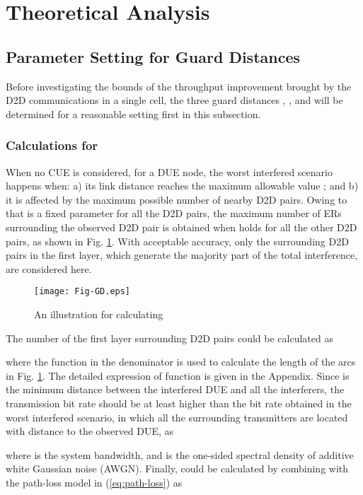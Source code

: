 \documentclass[journal, 10pt]{IEEEtran}
\begin{document}
\section{Theoretical Analysis}\label{sec:ana}

\subsection{Parameter Setting for Guard Distances}
Before investigating the bounds of the throughput improvement brought
by the D2D communications in a single cell, the three guard distances
, , and  will be determined
for a reasonable setting first in this subsection. 

\subsubsection{Calculations for }
When no CUE is considered, for a DUE node, the worst interfered
scenario happens when: a) its link distance reaches the maximum
allowable value ; and b) it is affected by the maximum
possible number of nearby D2D pairs. Owing to that  is a
fixed parameter for all the D2D pairs, the maximum number of ERs
surrounding the observed D2D pair is obtained when  holds for all the other D2D pairs, as shown in Fig.
\ref{fig:GD}. With acceptable accuracy, only the surrounding D2D pairs
in the first layer, which generate the majority part of the total
interference, are considered here. 
\begin{figure}[!h]
\centering
\texttt{[image: Fig-GD.eps]} \caption{An illustration for calculating } \label{fig:GD}
\end{figure}

The number of the first layer surrounding D2D pairs could be calculated as

where the function  in the denominator is used to
calculate the length of the arcs  in Fig.
\ref{fig:GD}. The detailed expression of function  is
given in the Appendix. Since  is the minimum distance
between the interfered DUE and all the interferers, the transmission
bit rate  should be at least higher than the bit rate obtained in
the worst interfered scenario, in which all the 
surrounding transmitters are located with distance  to
the observed DUE, as

where  is the system bandwidth, and  is the one-sided spectral
density of additive white Gaussian noise (AWGN). Finally, 
could be calculated by combining with the path-loss model in
(\ref{eq:path-loss}) as
\end{document}
